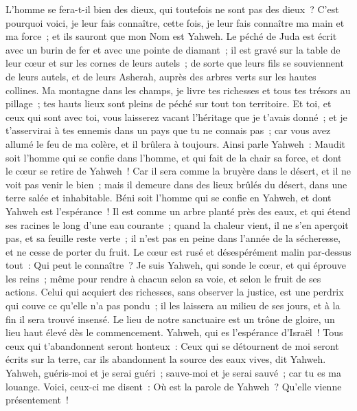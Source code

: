 \begin{multicols}{2}
L'homme se fera-t-il bien des dieux, qui toutefois ne sont pas des dieux~?
C'est pourquoi voici, je leur fais connaître, cette fois, je leur fais connaître ma main et ma force~; et ils sauront que mon Nom est Yahweh.
\VerseOne{}Le péché de Juda est écrit avec un burin de fer et avec une pointe de diamant~; il est gravé sur la table de leur cœur et sur les cornes de leurs autels~;
de sorte que leurs fils se souviennent de leurs autels, et de leurs Asherah, auprès des arbres verts sur les hautes collines.
Ma montagne dans les champs, je livre tes richesses et tous tes trésors au pillage~; tes hauts lieux sont pleins de péché sur tout ton territoire.
Et toi, et ceux qui sont avec toi, vous laisserez vacant l'héritage que je t'avais donné~; et je t'asservirai à tes ennemis dans un pays que tu ne connais pas~; car vous avez allumé le feu de ma colère, et il brûlera à toujours.
Ainsi parle Yahweh~: Maudit soit l'homme qui se confie dans l'homme, et qui fait de la chair sa force, et dont le cœur se retire de Yahweh~!
Car il sera comme la bruyère dans le désert, et il ne voit pas venir le bien~; mais il demeure dans des lieux brûlés du désert, dans une terre salée et inhabitable.
Béni soit l'homme qui se confie en Yahweh, et dont Yahweh est l'espérance~!
Il est comme un arbre planté près des eaux, et qui étend ses racines le long d'une eau courante~; quand la chaleur vient, il ne s'en aperçoit pas, et sa feuille reste verte~; il n'est pas en peine dans l'année de la sécheresse, et ne cesse de porter du fruit.
Le cœur est rusé et désespérément malin par-dessus tout~: Qui peut le connaître~?
Je suis Yahweh, qui sonde le cœur, et qui éprouve les reins~; même pour rendre à chacun selon sa voie, et selon le fruit de ses actions.
Celui qui acquiert des richesses, sans observer la justice, est une perdrix qui couve ce qu'elle n'a pas pondu~; il les laissera au milieu de ses jours, et à la fin il sera trouvé insensé.
Le lieu de notre sanctuaire est un trône de gloire, un lieu haut élevé dès le commencement.
Yahweh, qui es l'espérance d'Israël~! Tous ceux qui t'abandonnent seront honteux~: Ceux qui se détournent de moi seront écrits sur la terre, car ils abandonnent la source des eaux vives, dit Yahweh.
Yahweh, guéris-moi et je serai guéri~; sauve-moi et je serai sauvé~; car tu es ma louange.
Voici, ceux-ci me disent~: Où est la parole de Yahweh~? Qu'elle vienne présentement~!

\end{multicols}
